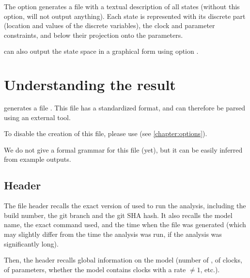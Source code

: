 The option  generates a file with a textual description of all states (without this option, \imitator{} will not output anything).
Each state is represented with its discrete part (location and values of the discrete variables), the clock and parameter constraints, and below their projection onto the parameters.

\imitator{} can also output the state space in a graphical form using option .


\chapter{Understanding the \imitator{} result}\label{chapter:result}

\imitator{} generates a file .
This file has a standardized format, and can therefore be parsed using an external tool.

To disable the creation of this file, please use 
(see \cref{chapter:options}).

We do not give a formal grammar for this file (yet), but it can be easily inferred from example outputs.


\section{Header}

The file header recalls the exact version of \imitator{} used to run the analysis, including the build number, the git branch and the git SHA hash.
It also recalls the model name, the exact command used, and the time when the file was generated (which may slightly differ from the time the analysis was run, if the analysis was significantly long).

Then, the header recalls global information on the model (number of \IPTA{}, of clocks, of parameters, whether the model contains clocks with a rate $\neq 1$, etc.).


